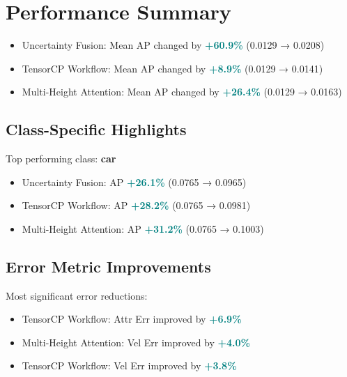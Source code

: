 \section*{Performance Summary}
\begin{itemize}
\item Uncertainty Fusion: Mean AP changed by \textcolor{teal}{\textbf{+60.9\%}} (0.0129 → 0.0208)
\item TensorCP Workflow: Mean AP changed by \textcolor{teal}{\textbf{+8.9\%}} (0.0129 → 0.0141)
\item Multi-Height Attention: Mean AP changed by \textcolor{teal}{\textbf{+26.4\%}} (0.0129 → 0.0163)
\end{itemize}
\subsection*{Class-Specific Highlights}
Top performing class: \textbf{car}
\begin{itemize}
\item Uncertainty Fusion: AP \textcolor{teal}{\textbf{+26.1\%}} (0.0765 → 0.0965)
\item TensorCP Workflow: AP \textcolor{teal}{\textbf{+28.2\%}} (0.0765 → 0.0981)
\item Multi-Height Attention: AP \textcolor{teal}{\textbf{+31.2\%}} (0.0765 → 0.1003)
\end{itemize}
\subsection*{Error Metric Improvements}
Most significant error reductions:
\begin{itemize}
\item TensorCP Workflow: Attr Err improved by \textcolor{teal}{\textbf{+6.9\%}}
\item Multi-Height Attention: Vel Err improved by \textcolor{teal}{\textbf{+4.0\%}}
\item TensorCP Workflow: Vel Err improved by \textcolor{teal}{\textbf{+3.8\%}}
\end{itemize}